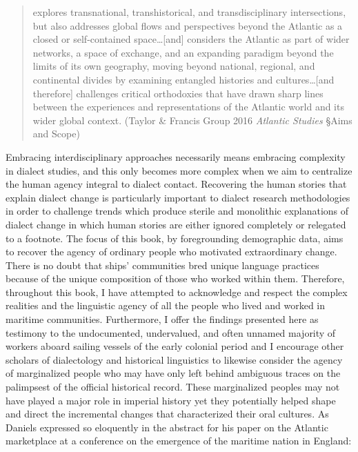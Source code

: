 \documentclass[12pt]{article}
\newenvironment{styleStandard}{\renewcommand\baselinestretch{1.0}\setlength\leftskip{0cm}\setlength\rightskip{0cm plus 1fil}\setlength\parindent{0cm}\setlength\parfillskip{0pt plus 1fil}\setlength\parskip{0in plus 1pt}\writerlistparindent\writerlistleftskip\leavevmode\normalfont\normalsize\writerlistlabel\ignorespaces}{\unskip\vspace{0in plus 1pt}\par}
\newcommand\writerlistleftskip{}
\newcommand\writerlistparindent{}
\newcommand\writerlistlabel{}
\begin{document}
\begin{quotation}
explores transnational, transhistorical, and transdisciplinary intersections, but also addresses global flows and perspectives beyond the Atlantic as a closed or self-contained space…[and] considers the Atlantic as part of wider networks, a space of exchange, and an expanding paradigm beyond the limits of its own geography, moving beyond national, regional, and continental divides by examining entangled histories and cultures…[and therefore] challenges critical orthodoxies that have drawn sharp lines between the experiences and representations of the Atlantic world and its wider global context. (Taylor \& Francis Group 2016 \textit{Atlantic Studies} §Aims and Scope)

\end{quotation}
\begin{styleStandard}
Embracing interdisciplinary approaches necessarily means embracing complexity in dialect studies, and this only becomes more complex when we aim to centralize the human agency integral to dialect contact. Recovering the human stories that explain dialect change is particularly important to dialect research methodologies in order to challenge trends which produce sterile and monolithic explanations of dialect change in which human stories are either ignored completely or relegated to a footnote. The focus of this book, by foregrounding demographic data, aims to recover the agency of ordinary people who motivated extraordinary change. There is no doubt that ships’ communities bred unique language practices because of the unique composition of those who worked within them. Therefore, throughout this book, I have attempted to acknowledge and respect the complex realities and the linguistic agency of all the people who lived and worked in maritime communities. Furthermore, I offer the findings presented here as testimony to the undocumented, undervalued, and often unnamed majority of workers aboard sailing vessels of the early colonial period and I encourage other scholars of dialectology and historical linguistics to likewise consider the agency of marginalized people who may have only left behind ambiguous traces on the palimpsest of the official historical record. These marginalized peoples may not have played a major role in imperial history yet they potentially helped shape and direct the incremental changes that characterized their oral cultures. As Daniels expressed so eloquently in the abstract for his paper on the Atlantic marketplace at a conference on the emergence of the maritime nation in England:
\end{styleStandard}
\end{document}
